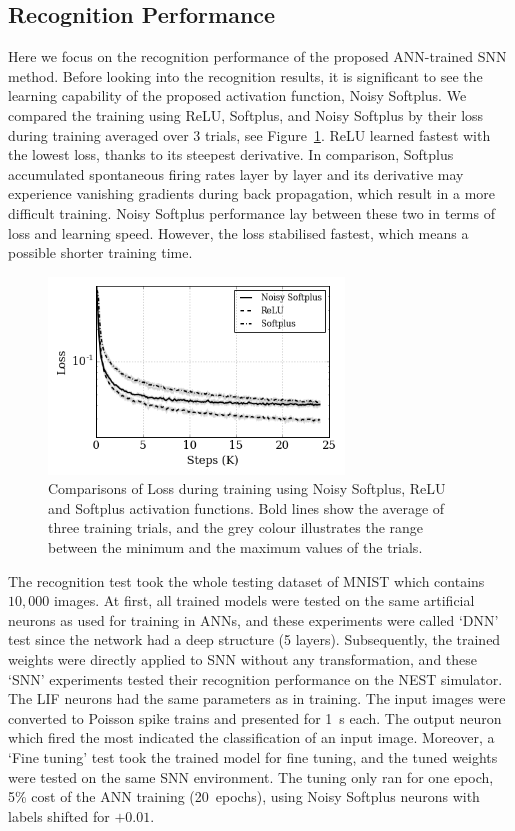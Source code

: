\documentclass[runningheads,a4paper]{llncs}
\begin{document}
\subsection{Recognition Performance}
\label{subsec:result_compare}
Here we focus on the recognition performance of the proposed ANN-trained SNN method.
Before looking into the recognition results, it is significant to see the learning capability of the proposed activation function, Noisy Softplus.
We compared the training using ReLU, Softplus, and Noisy Softplus by their loss during training averaged over 3 trials, see Figure~\ref{Fig:loss_ns}.
ReLU learned fastest with the lowest loss, thanks to its steepest derivative.
In comparison, Softplus accumulated spontaneous firing rates layer by layer and its derivative may experience vanishing gradients during back propagation, which result in a more difficult training.
Noisy Softplus performance lay between these two in terms of loss and learning speed.
However, the loss stabilised fastest, which means a possible shorter training time.
\begin{figure}[tbp!]
	\centering
	\includegraphics[width=0.7\textwidth]{8.png}
	\caption{Comparisons of Loss during training using Noisy Softplus, ReLU and Softplus activation functions. Bold lines show the average of three training trials, and the grey colour illustrates the range between the minimum and the maximum values of the trials.  }
	\label{Fig:loss_ns}
\end{figure}

The recognition test took the whole testing dataset of MNIST which contains $10,000$ images.
At first, all trained models were tested on the same artificial neurons as used for training in ANNs, and these experiments were called `DNN' test since the network had a deep structure (5 layers).
Subsequently, the trained weights were directly applied to SNN without any transformation, and these `SNN' experiments tested their recognition performance on the NEST simulator.
The LIF neurons had the same parameters as in training.
The input images were converted to Poisson spike trains and presented for 1~s each.
The output neuron which fired the most indicated the classification of an input image.
Moreover, a `Fine tuning' test took the trained model for fine tuning, and the tuned weights were tested on the same SNN environment.
The tuning only ran for one epoch, 5\% cost of the ANN training (20~epochs), using Noisy Softplus neurons with labels shifted for $+0.01$.
\end{document}
